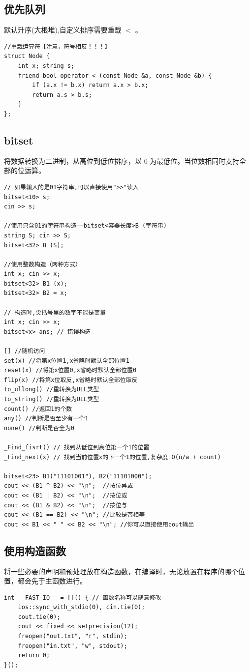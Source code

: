 \subsection{优先队列}
默认升序(大根堆),自定义排序需要重载 $<$ 。
\begin{lstlisting}[caption={}]
//重载运算符【注意，符号相反！！！】
struct Node {
    int x; string s;
    friend bool operator < (const Node &a, const Node &b) {
        if (a.x != b.x) return a.x > b.x;
        return a.s > b.s;
    }
};
\end{lstlisting}

\subsection{bitset}
将数据转换为二进制，从高位到低位排序，以 $0$ 为最低位。当位数相同时支持全部的位运算。
\begin{lstlisting}[caption={}]
// 如果输入的是01字符串,可以直接使用">>"读入
bitset<10> s;
cin >> s;

//使用只含01的字符串构造——bitset<容器长度>B (字符串)
string S; cin >> S;
bitset<32> B (S);

//使用整数构造（两种方式）
int x; cin >> x;
bitset<32> B1 (x);
bitset<32> B2 = x;

// 构造时,尖括号里的数字不能是变量
int x; cin >> x;
bitset<x> ans; // 错误构造

[] //随机访问
set(x) //将第x位置1,x省略时默认全部位置1
reset(x) //将第x位置0,x省略时默认全部位置0
flip(x) //将第x位取反,x省略时默认全部位取反
to_ullong() //重转换为ULL类型
to_string() //重转换为ULL类型
count() //返回1的个数
any() //判断是否至少有一个1
none() //判断是否全为0

_Find_fisrt() // 找到从低位到高位第一个1的位置
_Find_next(x) // 找到当前位置x的下一个1的位置,复杂度 O(n/w + count)

bitset<23> B1("11101001"), B2("11101000");
cout << (B1 ^ B2) << "\n";  //按位异或
cout << (B1 | B2) << "\n";  //按位或
cout << (B1 & B2) << "\n";  //按位与
cout << (B1 == B2) << "\n"; //比较是否相等
cout << B1 << " " << B2 << "\n"; //你可以直接使用cout输出
\end{lstlisting}

\subsection{使用构造函数}
将一些必要的声明和预处理放在构造函数，在编译时，无论放置在程序的哪个位置，都会先于主函数进行。
\begin{lstlisting}[caption={}]
int __FAST_IO__ = []() { // 函数名称可以随意修改
    ios::sync_with_stdio(0), cin.tie(0);
    cout.tie(0);
    cout << fixed << setprecision(12);
    freopen("out.txt", "r", stdin);
    freopen("in.txt", "w", stdout);
    return 0;
}();
\end{lstlisting}

